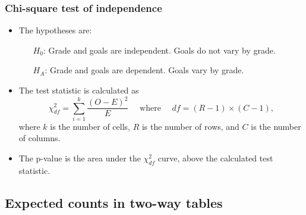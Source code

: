 
\begin{frame}
\frametitle{Chi-square test of independence}

\begin{itemize}
\item The hypotheses are:
\begin{itemize}
\item[$H_0$:] Grade and goals are independent. Goals do not vary by grade.
\item[$H_A$:] Grade and goals are dependent. Goals vary by grade.
\end{itemize}

\pause

\item The test statistic is calculated as
\[ \chi^2_{df} = \sum_{i = 1}^{k} \frac{(O - E)^2}{E} \quad \text{ where } \quad df = (R - 1) \times (C - 1), \]
where $k$ is the number of cells, $R$ is the number of rows, and $C$ is the number of columns.


\pause

\item The p-value is the area under the $\chi^2_{df}$ curve, above the calculated test statistic.

\end{itemize}


\end{frame}


\subsection{Expected counts in two-way tables}


